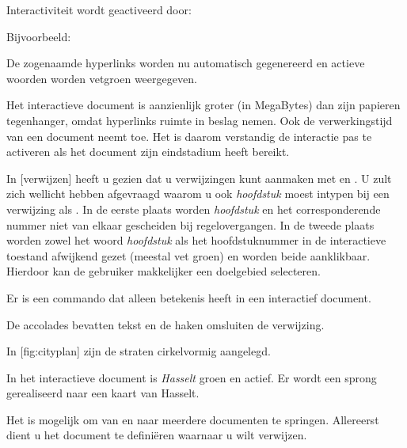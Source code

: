 Interactiviteit wordt geactiveerd door:


Bijvoorbeeld:

\startbuffer
\stelinteractiein
  [status=start,
   kleur=groen,
   letter=vet]
\stopbuffer

\typebuffer

De zogenaamde hyperlinks worden nu automatisch gegenereerd
en actieve woorden worden vetgroen weergegeven.

Het interactieve document is aanzienlijk groter (in
MegaBytes) dan zijn papieren tegenhanger, omdat hyperlinks
ruimte in beslag nemen. Ook de verwerkingstijd van een
document neemt toe. Het is daarom verstandig de interactie
pas te activeren als het document zijn eindstadium heeft
bereikt.



In [verwijzen] heeft u gezien dat u
verwijzingen kunt aanmaken met \type{\in} en \type{\op}. U
zult zich wellicht hebben afgevraagd waarom u ook {\em
hoofdstuk} moest intypen bij een verwijzing als
. In de eerste plaats
worden {\em hoofdstuk} en het corresponderende nummer niet
van elkaar gescheiden bij regelovergangen. In de tweede
plaats worden zowel het woord {\em hoofdstuk} als het
hoofdstuknummer in de interactieve toestand afwijkend gezet
(meestal vet groen) en worden beide aanklikbaar. Hierdoor
kan de gebruiker makkelijker een doelgebied selecteren.

Er is een commando dat alleen betekenis heeft
in een interactief document.


De accolades bevatten tekst en de haken omsluiten de
verwijzing.

\startbuffer
In [fig:cityplan] zijn de straten
cirkelvormig aangelegd.
\stopbuffer

\typebuffer

In het interactieve document is {\em Hasselt} groen
en actief. Er wordt een sprong gerealiseerd naar een kaart
van Hasselt.



Het is mogelijk om van en naar meerdere documenten te
springen. Allereerst dient u het document te defini\"eren
waarnaar u wilt verwijzen.

